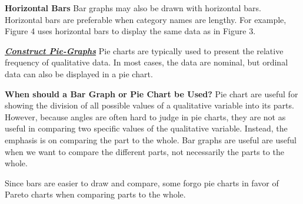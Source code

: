 \documentclass{report}
\begin{document}
        \bigbreak \noindent 
        \textbf{Horizontal Bars}
        \bigbreak \noindent 
        Bar graphs may also be drawn with horizontal bars. Horizontal bars are preferable when category names are lengthy. For example, Figure 4 uses horizontal bars to display the same data as in Figure 3.

        \bigbreak \noindent \bigbreak \noindent 
        \textbf{\textit{\underline{Construct Pie-Graphs}}}
        \bigbreak \noindent 
        Pie charts are typically used to present the relative frequency of qualitative data. In most cases, the data are nominal, but ordinal data can also be displayed in a pie chart.

        \bigbreak \noindent 
        \textbf{When should a Bar Graph or Pie Chart be Used?}
        \bigbreak \noindent 
        Pie chart are useful for showing the division of all possible values of a qualitative variable into its parts.
        \bigbreak \noindent 
        However, because angles are often hard to judge in pie charts, they are not as useful in comparing two specific values of the qualitative variable. 
        \bigbreak \noindent 
        Instead, the emphasis is on comparing the part to the whole.
        \bigbreak \noindent 
        Bar graphs are useful are useful when we want to compare the different parts, not necessarily the parts to the whole.

        \bigbreak \noindent 
        Since bars are easier to draw and compare, some forgo pie charts in favor of Pareto charts when comparing parts to the whole.

        \pagebreak \bigbreak \noindent
\end{document}
